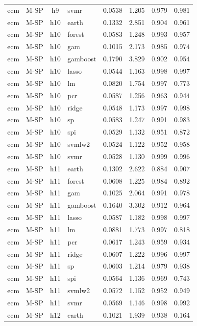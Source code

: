 \begin{ThreePartTable}
\begin{longtable}[t]{llclcccc}
ecm & M-SP & h9 & svmr & 0.0538 & 1.205 & 0.979 & 0.981\\
\addlinespace
ecm & M-SP & h10 & earth & 0.1332 & 2.851 & 0.904 & 0.961\\
ecm & M-SP & h10 & forest & 0.0583 & 1.248 & 0.993 & 0.957\\
ecm & M-SP & h10 & gam & 0.1015 & 2.173 & 0.985 & 0.974\\
ecm & M-SP & h10 & gamboost & 0.1790 & 3.829 & 0.902 & 0.954\\
ecm & M-SP & h10 & lasso & 0.0544 & 1.163 & 0.998 & 0.997\\
ecm & M-SP & h10 & lm & 0.0820 & 1.754 & 0.997 & 0.773\\
ecm & M-SP & h10 & pcr & 0.0587 & 1.256 & 0.963 & 0.944\\
ecm & M-SP & h10 & ridge & 0.0548 & 1.173 & 0.997 & 0.998\\
ecm & M-SP & h10 & sp & 0.0583 & 1.247 & 0.991 & 0.983\\
ecm & M-SP & h10 & spi & 0.0529 & 1.132 & 0.951 & 0.872\\
ecm & M-SP & h10 & svmlw2 & 0.0524 & 1.122 & 0.952 & 0.958\\
ecm & M-SP & h10 & svmr & 0.0528 & 1.130 & 0.999 & 0.996\\
\addlinespace
ecm & M-SP & h11 & earth & 0.1302 & 2.622 & 0.884 & 0.907\\
ecm & M-SP & h11 & forest & 0.0608 & 1.225 & 0.984 & 0.892\\
ecm & M-SP & h11 & gam & 0.1025 & 2.064 & 0.991 & 0.978\\
ecm & M-SP & h11 & gamboost & 0.1640 & 3.302 & 0.912 & 0.964\\
ecm & M-SP & h11 & lasso & 0.0587 & 1.182 & 0.998 & 0.997\\
ecm & M-SP & h11 & lm & 0.0881 & 1.773 & 0.997 & 0.818\\
ecm & M-SP & h11 & pcr & 0.0617 & 1.243 & 0.959 & 0.934\\
ecm & M-SP & h11 & ridge & 0.0607 & 1.222 & 0.996 & 0.997\\
ecm & M-SP & h11 & sp & 0.0603 & 1.214 & 0.979 & 0.938\\
ecm & M-SP & h11 & spi & 0.0564 & 1.136 & 0.969 & 0.743\\
ecm & M-SP & h11 & svmlw2 & 0.0572 & 1.152 & 0.952 & 0.949\\
ecm & M-SP & h11 & svmr & 0.0569 & 1.146 & 0.998 & 0.992\\
\addlinespace
ecm & M-SP & h12 & earth & 0.1021 & 1.939 & 0.938 & 0.164\\

\end{longtable}
\end{ThreePartTable}
